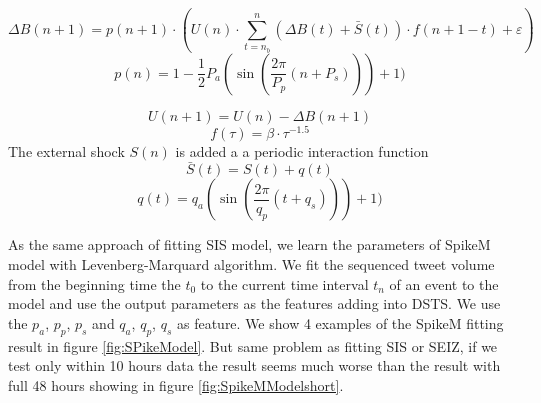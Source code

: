 \begin{equation}
\Delta B(n + 1) =p(n + 1)\cdot( U(n) \cdot  \sum ^n_{t=n_b}(\Delta B(t) +  \bar{S}(t))\cdot f(n+1-t) + \varepsilon )
\end{equation}
\begin{equation}
\label{periodic}
p(n) = 1-\frac{1}{2}P_a(\sin (\frac{2\pi}{P_p} (n+P_s)))+1)
\end{equation}

\begin{equation}
U(n + 1)=U(n)-\Delta {B(n + 1) }
\end{equation}
\begin{equation}
\label{decay}
f(\tau)=\beta \cdot \tau ^{-1.5}
\end{equation}
The external shock $S(n)$ is added a a periodic interaction function
\begin{equation}
\label{outs}
\bar{S}(t)=S(t)+q(t)
\end{equation}
\begin{equation}
q(t) =  q_a(\sin (\frac{2\pi}{q_p} (t+q_s)))+1)
\end{equation}


\begin{table}[!h]
 \centering
{}
\caption{New Parameters of extended SpikeM}
\label{tab:Features_Impsortance2}
\end{table}
\newpage
As the same approach of fitting SIS model, we learn the parameters of SpikeM model with Levenberg-Marquard algorithm. We fit the sequenced tweet volume from the beginning time the $t_0$ to the current time interval $t_n$ of an event to the model and use the output parameters as the features adding into DSTS. We use the $p_a$,  $p_p$, $p_s$ and $q_a$, $q_p$, $q_s$ as feature. We show 4 examples of the SpikeM fitting result in figure \ref{fig:SPikeModel}. But same problem as fitting SIS or SEIZ, if we test only within 10 hours data the result seems much worse than the result with full 48 hours showing in figure \ref{fig:SpikeMModelshort}.

